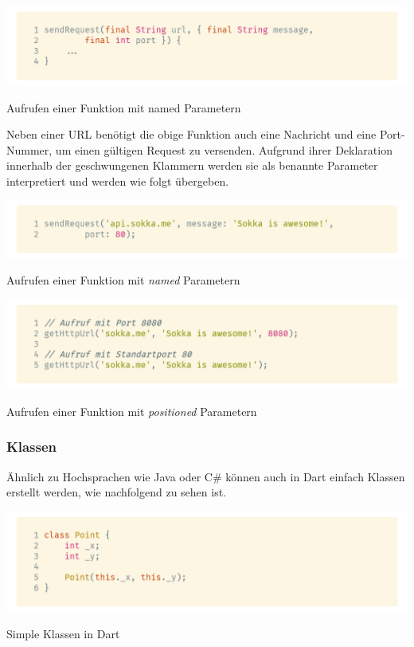 \begin{code}
    \centering
    \includegraphics[width=1\textwidth]{images/Dart/theory/dartNamedArguments.png}
    \caption{Aufrufen einer Funktion mit named Parametern}
\end{code}

Neben einer URL benötigt die obige Funktion auch eine Nachricht und eine Port-Nummer, um einen gültigen Request zu versenden. Aufgrund ihrer Deklaration innerhalb der geschwungenen Klammern
werden sie als benannte Parameter interpretiert und werden wie folgt übergeben.

\begin{code}[h]
    \centering
    \includegraphics[width=1\textwidth]{images/Dart/theory/dartCallNamedArguments.png}
    \caption{Aufrufen einer Funktion mit \textit{named} Parametern}
\end{code}

\begin{code}[h]
    \centering
    \includegraphics[width=1\textwidth]{images/Dart/theory/dartCallPositionedFunction.png}
    \caption{Aufrufen einer Funktion mit \textit{positioned} Parametern}
\end{code}

\newpage

\subsubsection{Klassen}

Ähnlich zu Hochsprachen wie Java oder C\# können auch in Dart einfach Klassen erstellt werden, wie nachfolgend zu sehen ist.

\begin{code}[h]
    \centering
    \includegraphics[width=1\textwidth]{images/Dart/theory/dartClass.png}
    \caption{Simple Klassen in Dart}
\end{code}

